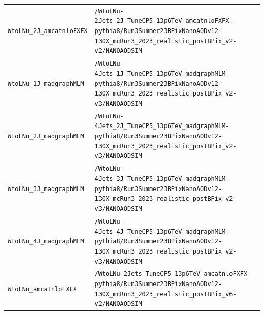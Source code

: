 \begin{longtable}{@{}>{\RaggedRight\arraybackslash}p{} >{\RaggedRight\arraybackslash}p{}@{}}
\addlinespace[2pt]
\texttt{WtoLNu\_\allowbreak{}2J\_\allowbreak{}amcatnloFXFX} & \texttt{/\allowbreak{}WtoLNu-\allowbreak{}2Jets\_\allowbreak{}2J\_\allowbreak{}TuneCP5\_\allowbreak{}13p6TeV\_\allowbreak{}amcatnloFXFX-\allowbreak{}pythia8/\allowbreak{}Run3Summer23BPixNanoAODv12-\allowbreak{}130X\_\allowbreak{}mcRun3\_\allowbreak{}2023\_\allowbreak{}realistic\_\allowbreak{}postBPix\_\allowbreak{}v2-\allowbreak{}v2/\allowbreak{}NANOAODSIM} \\
\addlinespace[2pt]
\texttt{WtoLNu\_\allowbreak{}1J\_\allowbreak{}madgraphMLM} & \texttt{/\allowbreak{}WtoLNu-\allowbreak{}4Jets\_\allowbreak{}1J\_\allowbreak{}TuneCP5\_\allowbreak{}13p6TeV\_\allowbreak{}madgraphMLM-\allowbreak{}pythia8/\allowbreak{}Run3Summer23BPixNanoAODv12-\allowbreak{}130X\_\allowbreak{}mcRun3\_\allowbreak{}2023\_\allowbreak{}realistic\_\allowbreak{}postBPix\_\allowbreak{}v2-\allowbreak{}v3/\allowbreak{}NANOAODSIM} \\
\addlinespace[2pt]
\texttt{WtoLNu\_\allowbreak{}2J\_\allowbreak{}madgraphMLM} & \texttt{/\allowbreak{}WtoLNu-\allowbreak{}4Jets\_\allowbreak{}2J\_\allowbreak{}TuneCP5\_\allowbreak{}13p6TeV\_\allowbreak{}madgraphMLM-\allowbreak{}pythia8/\allowbreak{}Run3Summer23BPixNanoAODv12-\allowbreak{}130X\_\allowbreak{}mcRun3\_\allowbreak{}2023\_\allowbreak{}realistic\_\allowbreak{}postBPix\_\allowbreak{}v2-\allowbreak{}v3/\allowbreak{}NANOAODSIM} \\
\addlinespace[2pt]
\texttt{WtoLNu\_\allowbreak{}3J\_\allowbreak{}madgraphMLM} & \texttt{/\allowbreak{}WtoLNu-\allowbreak{}4Jets\_\allowbreak{}3J\_\allowbreak{}TuneCP5\_\allowbreak{}13p6TeV\_\allowbreak{}madgraphMLM-\allowbreak{}pythia8/\allowbreak{}Run3Summer23BPixNanoAODv12-\allowbreak{}130X\_\allowbreak{}mcRun3\_\allowbreak{}2023\_\allowbreak{}realistic\_\allowbreak{}postBPix\_\allowbreak{}v2-\allowbreak{}v3/\allowbreak{}NANOAODSIM} \\
\addlinespace[2pt]
\texttt{WtoLNu\_\allowbreak{}4J\_\allowbreak{}madgraphMLM} & \texttt{/\allowbreak{}WtoLNu-\allowbreak{}4Jets\_\allowbreak{}4J\_\allowbreak{}TuneCP5\_\allowbreak{}13p6TeV\_\allowbreak{}madgraphMLM-\allowbreak{}pythia8/\allowbreak{}Run3Summer23BPixNanoAODv12-\allowbreak{}130X\_\allowbreak{}mcRun3\_\allowbreak{}2023\_\allowbreak{}realistic\_\allowbreak{}postBPix\_\allowbreak{}v2-\allowbreak{}v3/\allowbreak{}NANOAODSIM} \\
\addlinespace[2pt]
\texttt{WtoLNu\_\allowbreak{}amcatnloFXFX} & \texttt{/\allowbreak{}WtoLNu-\allowbreak{}2Jets\_\allowbreak{}TuneCP5\_\allowbreak{}13p6TeV\_\allowbreak{}amcatnloFXFX-\allowbreak{}pythia8/\allowbreak{}Run3Summer23BPixNanoAODv12-\allowbreak{}130X\_\allowbreak{}mcRun3\_\allowbreak{}2023\_\allowbreak{}realistic\_\allowbreak{}postBPix\_\allowbreak{}v6-\allowbreak{}v2/\allowbreak{}NANOAODSIM} \\

\end{longtable}
